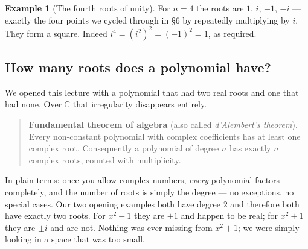 \documentclass[11pt]{article}
\theoremstyle{definition}
\newtheorem{ex}{Example}
\theoremstyle{remark}
\newcommand{\C}{\mathbb{C}}
\begin{document}
\begin{ex}[The fourth roots of unity]
For $n=4$ the roots are $1$, $i$, $-1$, $-i$ --- exactly the four points we
cycled through in \S6 by repeatedly multiplying by $i$. They form a square.
Indeed $i^{4}=(i^{2})^{2}=(-1)^{2}=1$, as required.
\end{ex}

\begin{center}
\hspace{1.2cm}
\end{center}

\subsection{How many roots does a polynomial have?}
We opened this lecture with a polynomial that had two real roots and one that
had none. Over $\C$ that irregularity disappears entirely.

\begin{quote}
\textbf{Fundamental theorem of algebra} (also called \emph{d'Alembert's
theorem}). Every non-constant polynomial with complex coefficients has at least
one complex root. Consequently a polynomial of degree $n$ has exactly $n$
complex roots, counted with multiplicity.
\end{quote}

\noindent In plain terms: once you allow complex numbers, \emph{every}
polynomial factors completely, and the number of roots is simply the degree ---
no exceptions, no special cases. Our two opening examples both have degree $2$
and therefore both have exactly two roots. For $x^{2}-1$ they are $\pm1$ and
happen to be real; for $x^{2}+1$ they are $\pm i$ and are not. Nothing was ever
missing from $x^{2}+1$; we were simply looking in a space that was too small.
\end{document}
